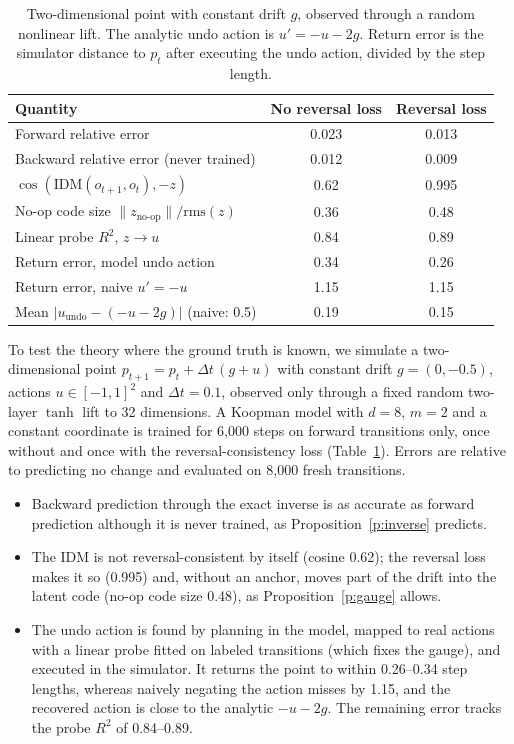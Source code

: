 \begin{table}
	\centering
	\caption{Two-dimensional point with constant drift $g$, observed through a random nonlinear lift. The analytic undo action is $u'=-u-2g$. Return error is the simulator distance to $p_t$ after executing the undo action, divided by the step length.}
	\label{t:toy}
	\footnotesize
	\setlength{\tabcolsep}{4pt}
	\begin{tabular}{lcc}
		\toprule
		Quantity & No reversal loss & Reversal loss \\
		\midrule
		Forward relative error & 0.023 & 0.013 \\
		Backward relative error (never trained) & 0.012 & 0.009 \\
		$\cos(\text{IDM}(o_{t+1},o_t),-z)$ & 0.62 & 0.995 \\
		No-op code size $\|z_{\text{no-op}}\|/\mathrm{rms}(z)$ & 0.36 & 0.48 \\
		Linear probe $R^2$, $z\to u$ & 0.84 & 0.89 \\
		Return error, model undo action & 0.34 & 0.26 \\
		Return error, naive $u'=-u$ & 1.15 & 1.15 \\
		Mean $|u_{\text{undo}}-(-u-2g)|$ (naive: 0.5) & 0.19 & 0.15 \\
		\bottomrule
	\end{tabular}
\end{table}

To test the theory where the ground truth is known, we simulate a two-dimensional point $p_{t+1}=p_t+\Delta t\,(g+u)$ with constant drift $g=(0,-0.5)$, actions $u\in[-1,1]^2$ and $\Delta t=0.1$, observed only through a fixed random two-layer $\tanh$ lift to 32 dimensions.
A Koopman model with $d=8$, $m=2$ and a constant coordinate is trained for 6,000 steps on forward transitions only, once without and once with the reversal-consistency loss (Table~\ref{t:toy}).
Errors are relative to predicting no change and evaluated on 8,000 fresh transitions.
\begin{itemize}
	\item Backward prediction through the exact inverse is as accurate as forward prediction although it is never trained, as Proposition~\ref{p:inverse} predicts.
	\item The IDM is not reversal-consistent by itself (cosine 0.62); the reversal loss makes it so (0.995) and, without an anchor, moves part of the drift into the latent code (no-op code size 0.48), as Proposition~\ref{p:gauge} allows.
	\item The undo action is found by planning in the model, mapped to real actions with a linear probe fitted on labeled transitions (which fixes the gauge), and executed in the simulator. It returns the point to within 0.26--0.34 step lengths, whereas naively negating the action misses by 1.15, and the recovered action is close to the analytic $-u-2g$. The remaining error tracks the probe $R^2$ of 0.84--0.89.
\end{itemize}

